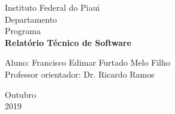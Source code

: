 \documentclass[a4paper, 12pt]{article}
\begin{document}

\begin{titlepage}
	\begin{center}
	

		\Huge{Instituto Federal do Piaui}\\
		\large{Departamento}\\ 
		\large{Programa}\\ 
		\vspace{15pt}
        \vspace{95pt}
        \textbf{\LARGE{Relatório Técnico de Software }}\\
		\vspace{3,5cm}
	\end{center}
	
	\begin{flushleft}
		\begin{tabbing}
			Aluno: Francisco Edimar Furtado Melo Filho\\
			Professor orientador: Dr. Ricardo Ramos\\
	\end{tabbing}
 \end{flushleft}
	\vspace{1cm}
	
	\begin{center}
		\vspace{\fill}
			 Outubro\\
		 2019
			\end{center}
\end{titlepage}

\end{document}

